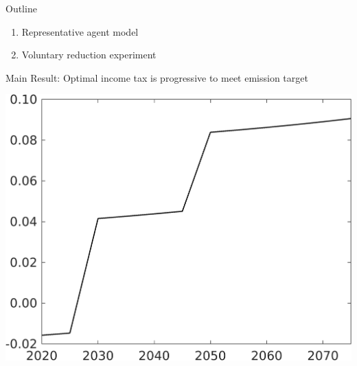 \documentclass[11pt,aspectratio=169]{beamer}
\begin{document}
\begin{frame}{Outline}
\begin{enumerate}
	\item Representative agent model
	\item Voluntary reduction experiment
\end{enumerate}
\end{frame}
\begin{frame}{Main Result: Optimal income tax is progressive to meet emission target}
			\centering
	\begin{minipage}[]{0.32\textwidth}
\includegraphics[width=1\textwidth]{../codding_model/own_basedOnFried/optimalPol_elastS_DisuSci/figures/all_1705/Single_OPT_T_NoTaus_taul_spillover0_sep1_BN0_ineq0_red0_etaa0.79.png}
	\end{minipage}
\begin{minipage}[]{0.05\textwidth}
	\ \ \\ 
	\ \ 
\end{minipage}
	\begin{minipage}[]{0.32\textwidth}

\end{minipage}
\end{frame}
\end{document}
